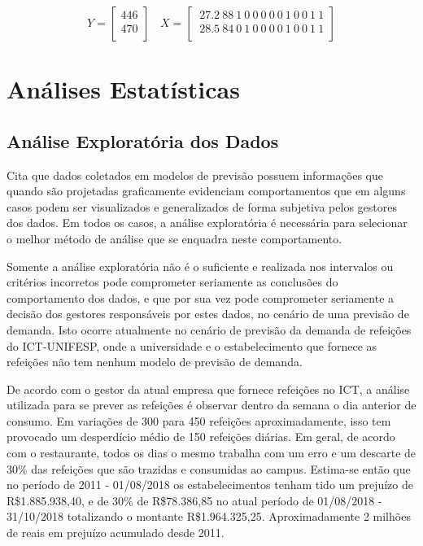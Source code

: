 \documentclass[	12pt, Times, openright, twoside, a4paper, english, brazil]{abntex2}
\begin{document}
            $$Y=\left[\begin{array}{c}
            446\\
            470\\
            \end{array}\right]~~
            ~~X=\left[\begin{array}{ccccccccccccc}
            ~27.2 ~88 ~1 ~0 ~0 ~0 ~0 ~0 ~1 ~0 ~0 ~1 ~1\\
            ~28.5 ~84 ~0 ~1 ~0 ~0 ~0 ~0 ~1 ~0 ~0 ~1 ~1\\
            \end{array}\right]$$

      \section{Análises Estatísticas}
        \subsection{Análise Exploratória dos Dados}
          \cite{Junior2007} Cita que dados coletados em modelos de previsão possuem informações que quando são projetadas graficamente evidenciam comportamentos que em alguns casos podem ser visualizados e generalizados de forma subjetiva pelos gestores dos dados.  
          Em todos os casos, a análise exploratória é necessária para selecionar o melhor método de análise que se enquadra neste comportamento.

          Somente a análise exploratória não é o suficiente e realizada nos intervalos ou critérios incorretos pode comprometer seriamente as conclusões do comportamento dos dados, e que por sua vez pode comprometer seriamente a decisão dos gestores responsáveis por estes dados, no cenário de uma previsão de demanda. 
          Isto ocorre atualmente no cenário de previsão da demanda de refeições do ICT-UNIFESP, onde a universidade e o estabelecimento que fornece as refeições não tem nenhum modelo de previsão de demanda. 

          De acordo com o gestor da atual empresa que fornece refeições no ICT, a análise utilizada para se prever as refeições é observar dentro da semana o dia anterior de consumo. Em variações de 300 para 450 refeições aproximadamente, isso tem provocado um desperdício médio de 150 refeições diárias. Em geral, de acordo com o restaurante, todos os dias o mesmo trabalha com um erro e um descarte de 30\% das refeições que são trazidas e consumidas ao campus. Estima-se então que no período de 2011 - 01/08/2018 os estabelecimentos tenham tido um prejuízo de R\$1.885.938,40, e de 30\% de R\$78.386,85 no atual período de 01/08/2018 - 31/10/2018 totalizando o montante  R\$1.964.325,25. Aproximadamente 2 milhões de reais em prejuízo acumulado desde 2011.
\end{document}
